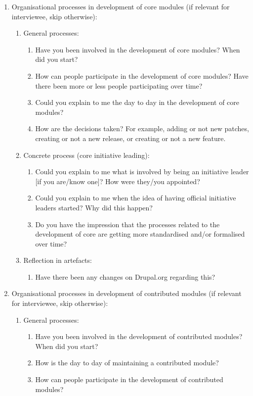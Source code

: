 \begin{enumerate}
	\item Organisational processes in development of core modules (if relevant for interviewee, skip otherwise):
		\begin{enumerate}
			\item General processes:
			\begin{enumerate}
				\item Have you been involved in the development of core modules? When did you start?
				\item How can people participate in the development of core modules? Have there been more or less people participating over time?
				\item Could you explain to me the day to day in the development of core modules?
				\item How are the decisions taken? For example, adding or not new patches, creating or not a new release, or creating or not a new feature.
			\end{enumerate}	
			\item Concrete process (core initiative leading):
			\begin{enumerate}		
				\item Could you explain to me what is involved by being an initiative leader [if you are/know one]? How were they/you appointed? 
				\item Could you explain to me when the idea of having official initiative leaders started? Why did this happen?
				\item Do you have the impression that the processes related to the development of core are getting more standardised and/or formalised over time?	
			\end{enumerate}		
			\item Reflection in artefacts:
			\begin{enumerate}		
				\item Have there been any changes on Drupal.org regarding this?
			\end{enumerate}
		\end{enumerate}
	
	\item Organisational processes in development of contributed modules (if relevant for interviewee, skip otherwise):
		\begin{enumerate}
			\item General processes:
			\begin{enumerate}
				\item Have you been involved in the development of contributed modules? When did you start?
				\item How is the day to day of maintaining a contributed module?
				\item How can people participate in the development of contributed modules?
			\end{enumerate}


\end{enumerate}
\end{enumerate}
